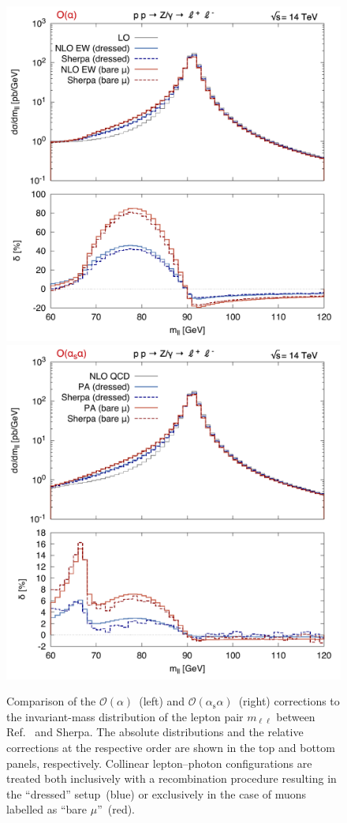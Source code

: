 \documentclass[11pt]{cernrep}
\newcommand{\order}{\ensuremath{\mathcal{O}}}
\newcommand{\alphas}{\ensuremath{\alpha_\mathrm{s}}}
\DeclareRobustCommand{\Pl}{{\ensuremath{\ell}}}
\begin{document}
\begin{figure}
  \includegraphics[width=.48\linewidth]{images/Z_mll2_LO.pdf} \hfill
  \includegraphics[width=.48\linewidth]{images/Z_mll2_NLO.pdf} 
  \caption{
    Comparison of the $\order(\alpha)$~(left) and $\order(\alphas\alpha)$~(right) corrections to the invariant-mass distribution of the lepton pair $m_{\Pl\Pl}$ between Ref.~\cite{Dittmaier:2015rxo} and Sherpa.
    The absolute distributions and the relative corrections at the respective order are shown in the top and bottom panels, respectively.
    Collinear lepton--photon configurations are treated both inclusively with a recombination procedure resulting in the ``dressed'' setup~(blue) or exclusively in the case of muons labelled as ``bare $\mu$''~(red).
  }
  \label{fig:mll}
\end{figure}
\end{document}
